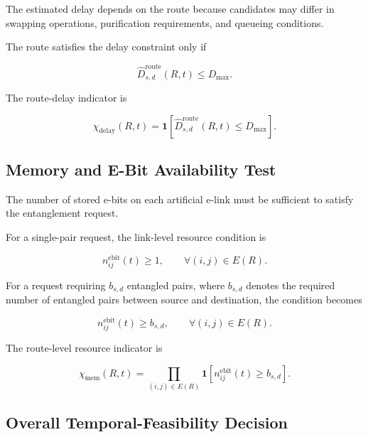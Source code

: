 The estimated delay depends on the route because candidates may differ in swapping operations, purification requirements, and queueing conditions.

The route satisfies the delay constraint only if

\begin{equation}
    \widehat{D}_{s,d}^{\mathrm{route}}(R,t)
    \leq
    D_{\max}.
\end{equation}

The route-delay indicator is

\begin{equation}
    \chi_{\mathrm{delay}}(R,t)
    =
    \mathbf{1}
    \left[
    \widehat{D}_{s,d}^{\mathrm{route}}(R,t)
    \leq
    D_{\max}
    \right].
\end{equation}

\subsection{Memory and E-Bit Availability Test}

The number of stored e-bits on each artificial e-link must be sufficient to satisfy the entanglement request.

For a single-pair request, the link-level resource condition is

\begin{equation}
    n_{ij}^{\mathrm{ebit}}(t)
    \geq
    1,
    \qquad
    \forall (i,j)
    \in
    E(R).
\end{equation}

For a request requiring $b_{s,d}$ entangled pairs, where $b_{s,d}$ denotes the required number of entangled pairs between source and destination, the condition becomes

\begin{equation}
    n_{ij}^{\mathrm{ebit}}(t)
    \geq
    b_{s,d},
    \qquad
    \forall (i,j)
    \in
    E(R).
\end{equation}

The route-level resource indicator is

\begin{equation}
    \chi_{\mathrm{mem}}(R,t)
    =
    \prod_{
    (i,j)
    \in
    E(R)
    }
    \mathbf{1}
    \left[
    n_{ij}^{\mathrm{ebit}}(t)
    \geq
    b_{s,d}
    \right].
\end{equation}


\subsection{Overall Temporal-Feasibility Decision}

